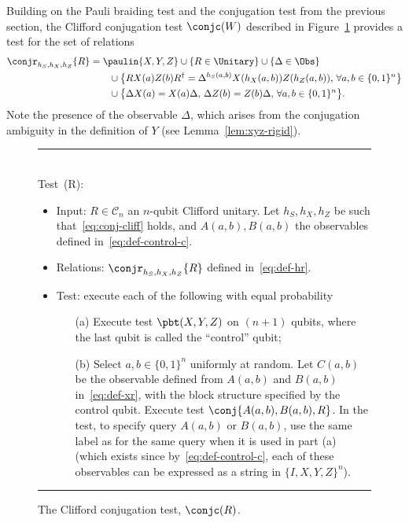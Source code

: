 Building on the Pauli braiding test and the conjugation test from the previous section, the Clifford conjugation test $\conjc(W)$ described in Figure~\ref{fig:conjugation-test-2} 
 provides a test for the set of relations 
\begin{align}
\conjr_{h_S,h_X,h_Z}\{R\} &= \paulin\{X,Y,Z\}  \cup \{R\in \Unitary\} \cup \{\Delta\in\Obs\}\notag\\
&\qquad \cup \big\{ R X(a)Z(b)R^\dagger = \Delta^{h_S(a,b)}X(h_X(a,b))Z(h_Z(a,b)),\,\forall a,b\in\{0,1\}^n\big\} \notag\\
&\qquad \cup \big\{ \Delta X(a) = X(a)\Delta,\,\Delta Z(b)=Z(b)\Delta,\,\forall a,b\in\{0,1\}^n\big\}.\label{eq:def-hr}
\end{align}
Note the presence of the observable $\Delta$, which arises from the conjugation ambiguity in the definition of $Y$ (see Lemma~\ref{lem:xyz-rigid}). 

\begin{figure}[H]
\rule[1ex]{16.5cm}{0.5pt}\\
Test~\conjc(R): 
\begin{itemize}
    \item Input: $R \in \mathcal{C}_n$ an $n$-qubit Clifford unitary. 	Let $h_S,h_X,h_Z$ be such that~\eqref{eq:conj-cliff} holds, and $A(a,b),B(a,b)$ the observables defined in~\eqref{eq:def-control-c}. 
    \item Relations: $\conjr_{h_S,h_X,h_Z}\{R\}$ defined in~\eqref{eq:def-hr}. 
    \item Test: execute each of the following with equal probability
\begin{enumerate}
\item[(a)] Execute test $\pbt(X,Y,Z)$ on $(n+1)$ qubits, where the last qubit is called the ``control'' qubit;
\item[(b)] Select $a,b\in\{0,1\}^n$ uniformly at random. Let $C(a,b)$ be the observable defined from $A(a,b)$ and $B(a,b)$ in~\eqref{eq:def-xr}, with the block structure specified by the control qubit. Execute test $\conj\{A(a,b),B(a,b),R\}$. In the test, to specify query $A(a,b)$ or $B(a,b)$, use the same label as for the same query when it is used in part (a) (which exists since by~\eqref{eq:def-control-c}, each of these observables can be expressed as a string in $\{I,X,Y,Z\}^n$).
\end{enumerate}
\end{itemize}
\rule[2ex]{16.5cm}{0.5pt}\vspace{-0cm}
\caption{The Clifford conjugation test, $\conjc(R)$.}
\label{fig:conjugation-test-2}
\end{figure}

